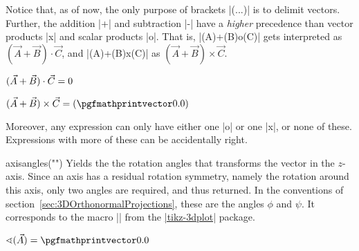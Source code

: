 \documentclass[a4paper,fleqn]{ltxdoc}
\begin{document}
Notice that, as of now, the only purpose of brackets |(...)| is to delimit
vectors. Further, the addition |+| and subtraction |-| have a \emph{higher}
precedence than vector products |x| and scalar products |o|. That is,
|(A)+(B)o(C)| gets interpreted as $(\vec A+\vec B)\cdot\vec C$, and
|(A)+(B)x(C)| as $(\vec A+\vec B)\times\vec C$.



\begin{codeexample}[width=5.2cm]
%
$(\vec A+\vec B)\cdot\vec C=
\pgfmathprintnumber\pgfmathresult$
\end{codeexample}

\begin{codeexample}[width=5.2cm]
%
$(\vec A+\vec B)\times\vec C=
(\pgfmathprintvector\pgfmathresult)$
\end{codeexample}

Moreover, any expression can only have either one |o| or one |x|, or none of
these. Expressions with more of these can be accidentally right.

\begin{math-function}{axisangles("")}
   Yields the the rotation angles that transforms the vector in the $z$-axis.
   Since an axis has a residual rotation symmetry, namely the rotation around
   this axis, only two angles are required, and thus returned. In the
   conventions of section~\ref{sec:3DOrthonormalProjections}, these are the
   angles $\phi$ and $\psi$. It corresponds to the macro
   |\tdplotgetpolarcoords| from the 
   \href{https://ctan.org/pkg/tikz-3dplot?lang=en}{|tikz-3dplot|} package.
\end{math-function}

\begin{codeexample}[width=5.2cm]
%
$\sphericalangle(\vec A)=
\pgfmathprintvector\pgfmathresult$
\end{codeexample}


% 

\end{document}
